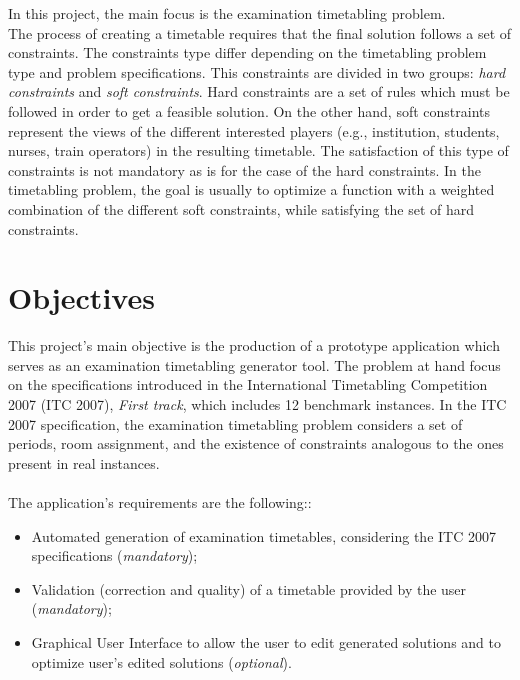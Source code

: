 In this project, the main focus is the examination timetabling problem. \\

The process of creating a timetable requires that the final solution follows a set of constraints. The constraints type differ depending on the timetabling problem type and problem specifications. This constraints are divided in two groups: \textit{hard constraints} and \textit{soft constraints}. Hard constraints are a set of rules which must be followed in order to get a feasible solution. On the other hand, soft constraints represent the views of the different interested players (e.g., institution, students, nurses, train operators) in the resulting timetable. The satisfaction of this type of constraints is not mandatory as is for the case of the hard constraints. In the timetabling problem, the goal is usually to optimize a function with a weighted combination of the different soft constraints, while satisfying the set of hard constraints. 

\section{Objectives}
\label{section:Objts}

This project's main objective is the production of a prototype application which serves as an examination timetabling generator tool. The problem at hand focus on the specifications introduced in the International Timetabling Competition 2007 (ITC 2007), \textit{First track}, which includes 12 benchmark instances. In the ITC 2007 specification, the examination timetabling problem considers a set of periods, room assignment, and the existence of constraints analogous to the ones present in real instances.\\
\\
The application's requirements are the following::

\begin{itemize}
	\item Automated generation of examination timetables, considering the ITC 2007 specifications (\textit{mandatory});
	\item Validation (correction and quality) of a timetable provided by the user (\textit{mandatory});
	\item Graphical User Interface to allow the user to edit generated solutions and to optimize user's edited solutions (\textit{optional}).
\end{itemize}

